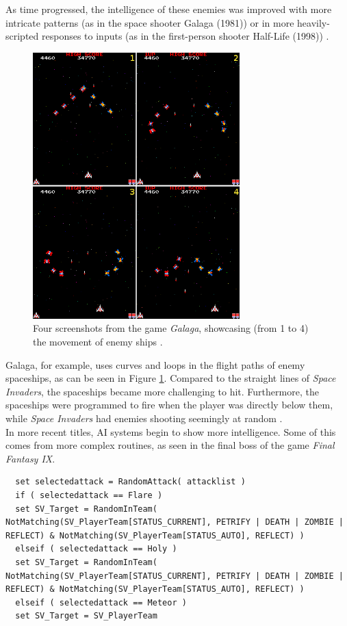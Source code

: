 As time progressed, the intelligence of these enemies was improved with more intricate patterns (as in the space shooter Galaga (1981)) or in more heavily-scripted responses to inputs (as in the first-person shooter Half-Life (1998)) \cite{schw04}.
\begin{figure}[H]
  \centering
  \includegraphics[width=8cm]{figures/ExampleGalaga.png}
  \caption{Four screenshots from the game \textit{Galaga}, showcasing (from 1 to 4) the movement of enemy ships \cite{galaga81}.}
  \label{fig:Galaga}
\end{figure}
Galaga, for example, uses curves and loops in the flight paths of enemy spaceships, as can be seen in Figure \ref{fig:Galaga}. Compared to the straight lines of \textit{Space Invaders}, the spaceships became more challenging to hit. Furthermore, the spaceships were programmed to fire when the player was directly below them, while \textit {Space Invaders} had enemies shooting seemingly at random \cite{schw04}.\\

In more recent titles, AI systems begin to show more intelligence. Some of this comes from more complex routines, as seen in the final boss of the game \textit{Final Fantasy IX}.

\begin{lstlisting}
  set selectedattack = RandomAttack( attacklist )
  if ( selectedattack == Flare )
  set SV_Target = RandomInTeam( NotMatching(SV_PlayerTeam[STATUS_CURRENT], PETRIFY | DEATH | ZOMBIE | REFLECT) & NotMatching(SV_PlayerTeam[STATUS_AUTO], REFLECT) )
  elseif ( selectedattack == Holy )
  set SV_Target = RandomInTeam( NotMatching(SV_PlayerTeam[STATUS_CURRENT], PETRIFY | DEATH | ZOMBIE | REFLECT) & NotMatching(SV_PlayerTeam[STATUS_AUTO], REFLECT) )
  elseif ( selectedattack == Meteor )
  set SV_Target = SV_PlayerTeam
\end{lstlisting}

